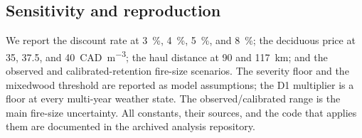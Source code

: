 \subsection{Sensitivity and reproduction}

We report the discount rate at \SI{3}{\percent}, \SI{4}{\percent}, \SI{5}{\percent}, and
\SI{8}{\percent}; the deciduous price at 35, 37.5, and \SI{40}{CAD\per\cubic\meter}; the haul
distance at 90 and \SI{117}{\kilo\meter}; and the observed and calibrated-retention fire-size
scenarios. The severity floor and the mixedwood threshold are reported as model
assumptions; the D1 multiplier is a floor at every multi-year weather state. The observed/calibrated
range is the main fire-size uncertainty. All constants, their sources, and the code that applies them
are documented in the archived analysis repository.
